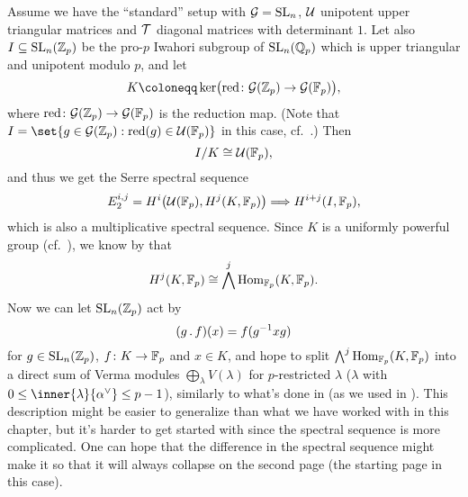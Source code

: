 Assume we have the \enquote{standard} setup with $\mathcal{G} = \operatorname{SL}_{n}$, $\mathcal{U}$ unipotent upper triangular matrices and $\mathcal{T}$ diagonal matrices with determinant $1$. Let also $I \subseteq \operatorname{SL}_{n}(\mathbb{Z}_{p})$ be the pro-$p$ Iwahori subgroup of $\operatorname{SL}_{n}(\mathbb{Q}_{p})$ which is upper triangular and unipotent modulo $p$, and let
\begin{equation*}
  K \coloneqq \kernel\bigl( \red \colon \gs{G}(\Z_{p}) \to \gs{G}(\F_{p}) \bigr),
\end{equation*}
where $\operatorname{red} \colon \mathcal{G}(\mathbb{Z}_{p}) \to \mathcal{G}(\mathbb{F}_{p})$ is the reduction map. (Note that $I = \set{g \in \gs{G}(\Z_{p}) : \red(g) \in \gs{U}(\F_{p})}$ in this case, cf.\ \cite{Generators}.) Then
\begin{equation*}
  I/K \cong \mathcal{U}(\mathbb{F}_{p}),
\end{equation*}
and thus we get the Serre spectral sequence
\begin{equation*}
  E_{2}^{i,j} = H^{i}\bigl( \mathcal{U}(\mathbb{F}_{p}), H^{j}(K,\mathbb{F}_{p}) \bigr) \Longrightarrow H^{i+j}(I,\mathbb{F}_{p}),
\end{equation*}
which is also a multiplicative spectral sequence. Since $K$ is a uniformly powerful group (cf.\ \cite[Prop.~7.6]{SchOll-modular}), we know by \cite[p.~183]{Laz} that
\begin{equation*}
  H^{j}(K,\mathbb{F}_{p}) \cong \bigwedge^{j} \operatorname{Hom}_{\mathbb{F}_{p}}(K,\mathbb{F}_{p}).
\end{equation*}
Now we can let $\operatorname{SL}_{n}(\mathbb{Z}_{p})$ act by
\begin{equation*}
  (g \,.\, f)(x) = f(g^{-1}xg)
\end{equation*}
for $g \in \operatorname{SL}_{n}(\mathbb{Z}_{p})$, $f \colon K \to \mathbb{F}_{p}$ and $x \in K$, and hope to split $\bigwedge^{j} \operatorname{Hom}_{\mathbb{F}_{p}}(K,\mathbb{F}_{p})$ into a direct sum of Verma modules $\bigoplus_{\lambda} V(\lambda)$ for $p$-restricted $\lambda$ ($\lambda$ with $0 \leq \inner{\lambda}{\alpha^{\vee}} \leq p-1$), similarly to what's done in \cite{PT} (as we used in ). This description might be easier to generalize than what we have worked with in this chapter, but it's harder to get started with since the spectral sequence is more complicated. One can hope that the difference in the spectral sequence might make it so that it will always collapse on the second page (the starting page in this case).



